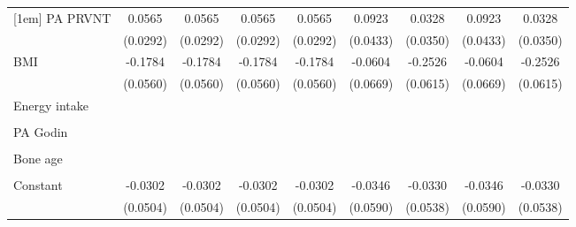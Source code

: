 \begin{table}[htbp]
\begin{tabular}{l*{8}{c}}
[1em]
PA PRVNT                 &    0.0565\sym{*}  &    0.0565\sym{*}  &    0.0565\sym{*}  &    0.0565\sym{*}  &    0.0923\sym{**} &    0.0328         &    0.0923\sym{**} &    0.0328         \\
                         &  (0.0292)         &  (0.0292)         &  (0.0292)         &  (0.0292)         &  (0.0433)         &  (0.0350)         &  (0.0433)         &  (0.0350)         \\
[1em]
BMI                      &   -0.1784\sym{***}&   -0.1784\sym{***}&   -0.1784\sym{***}&   -0.1784\sym{***}&   -0.0604         &   -0.2526\sym{***}&   -0.0604         &   -0.2526\sym{***}\\
                         &  (0.0560)         &  (0.0560)         &  (0.0560)         &  (0.0560)         &  (0.0669)         &  (0.0615)         &  (0.0669)         &  (0.0615)         \\
[1em]
Energy intake            &                   &                   &                   &                   &                   &                   &                   &                   \\
                         &                   &                   &                   &                   &                   &                   &                   &                   \\
[1em]
PA Godin                 &                   &                   &                   &                   &                   &                   &                   &                   \\
                         &                   &                   &                   &                   &                   &                   &                   &                   \\
[1em]
Bone age                 &                   &                   &                   &                   &                   &                   &                   &                   \\
                         &                   &                   &                   &                   &                   &                   &                   &                   \\
[1em]
Constant                 &   -0.0302         &   -0.0302         &   -0.0302         &   -0.0302         &   -0.0346         &   -0.0330         &   -0.0346         &   -0.0330         \\
                         &  (0.0504)         &  (0.0504)         &  (0.0504)         &  (0.0504)         &  (0.0590)         &  (0.0538)         &  (0.0590)         &  (0.0538)         \\

\end{tabular}
\end{table}
